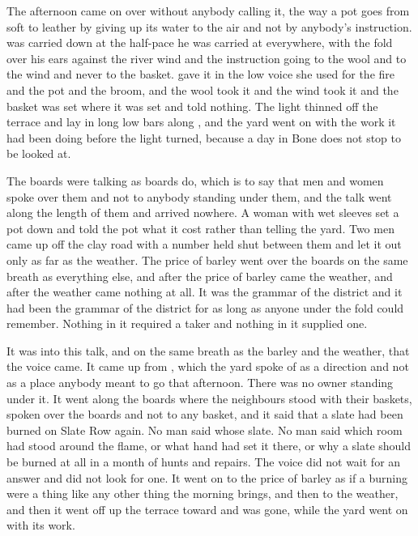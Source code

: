 The afternoon came on over  without anybody calling it, the way a pot goes from soft to leather by giving up its water to the air and not by anybody's instruction.  was carried down at the half-pace he was carried at everywhere, with the fold over his ears against the river wind and the instruction going to the wool and to the wind and never to the basket.  gave it in the low voice she used for the fire and the pot and the broom, and the wool took it and the wind took it and the basket was set where it was set and told nothing. The light thinned off the terrace and lay in long low bars along , and the yard went on with the work it had been doing before the light turned, because a day in Bone does not stop to be looked at.

The boards were talking as boards do, which is to say that men and women spoke over them and not to anybody standing under them, and the talk went along the length of them and arrived nowhere. A woman with wet sleeves set a pot down and told the pot what it cost rather than telling the yard. Two men came up off the clay road with a number held shut between them and let it out only as far as the weather. The price of barley went over the boards on the same breath as everything else, and after the price of barley came the weather, and after the weather came nothing at all. It was the grammar of the district and it had been the grammar of the district for as long as anyone under the fold could remember. Nothing in it required a taker and nothing in it supplied one.

It was into this talk, and on the same breath as the barley and the weather, that the voice came. It came up from , which the yard spoke of as a direction and not as a place anybody meant to go that afternoon. There was no owner standing under it. It went along the boards where the neighbours stood with their baskets, spoken over the boards and not to any basket, and it said that a slate had been burned on Slate Row again. No man said whose slate. No man said which room had stood around the flame, or what hand had set it there, or why a slate should be burned at all in a month of hunts and repairs. The voice did not wait for an answer and did not look for one. It went on to the price of barley as if a burning were a thing like any other thing the morning brings, and then to the weather, and then it went off up the terrace toward  and was gone, while the yard went on with its work.

